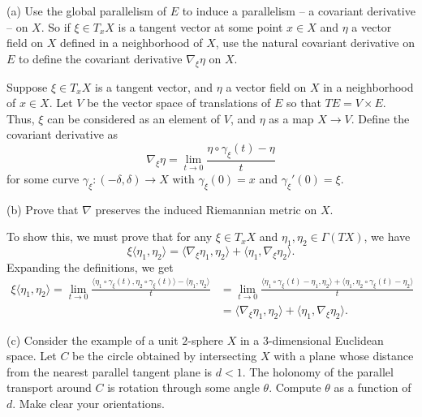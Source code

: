 \documentclass{../../templates/lkx_pset}
\begin{document}
\begin{parts}
  \begin{part}{(a)}
    Use the global parallelism of $E$ to induce a parallelism -- a covariant derivative -- on $X$. So if $\xi\in T_xX$ is a tangent vector at some point $x\in X$ and $\eta$ a vector field on $X$ defined in a neighborhood of $X$, use the natural covariant derivative on $E$ to define the covariant derivative $\nabla_\xi \eta$ on $X$.
  \end{part}

  Suppose $\xi\in T_x X$ is a tangent vector, and $\eta$ a vector field on $X$ in a neighborhood of $x\in X$. Let $V$ be the vector space of translations of $E$ so that $TE=V\times E$. Thus, $\xi$ can be considered as an element of $V$, and $\eta$ as a map $X \to V$. Define the covariant derivative as
  \[
    \nabla_\xi \eta = \lim_{t\to 0}\frac{\eta\circ \gamma_\xi(t) - \eta}{t}
  \]
  for some curve $\gamma_\xi : (-\delta, \delta) \to X$ with $\gamma_\xi(0)=x$ and $\gamma_\xi'(0)=\xi$.

  \begin{part}{(b)}
    Prove that $\nabla$ preserves the induced Riemannian metric on $X$.
  \end{part}

  To show this, we must prove that for any $\xi\in T_x X$ and $\eta_1,\eta_2\in \Gamma(TX)$, we have
  \[
    \xi\langle\eta_1, \eta_2\rangle = \langle\nabla_\xi \eta_1, \eta_2\rangle + \langle\eta_1, \nabla_\xi \eta_2\rangle.
  \]
  Expanding the definitions, we get
  \[
    \begin{aligned}
      \xi\langle\eta_1, \eta_2\rangle = \lim_{t\to 0} \frac{\langle\eta_1\circ \gamma_\xi(t), \eta_2\circ \gamma_\xi(t)\rangle - \langle \eta_1,\eta_2\rangle}{t} 
      &= \lim_{t\to 0}\frac{\langle\eta_1\circ \gamma_\xi(t) - \eta_1, \eta_2\rangle + \langle\eta_1, \eta_2 \circ \gamma_\xi(t) - \eta_2\rangle}{t}\\
      &= \langle\nabla_\xi \eta_1, \eta_2\rangle + \langle\eta_1, \nabla_\xi \eta_2\rangle. 
    \end{aligned}
  \]

  \begin{part}{(c)}
    Consider the example of a unit $2$-sphere $X$ in a $3$-dimensional Euclidean space. Let $C$ be the circle obtained by intersecting $X$ with a plane whose distance from the nearest parallel tangent plane is $d< 1$. The holonomy of the parallel transport around $C$ is rotation through some angle $\theta$. Compute $\theta$ as a function of $d$. Make clear your orientations.
  \end{part}

\end{parts}
\end{document}
